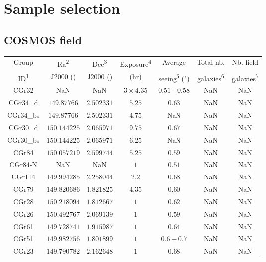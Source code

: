 \clearpage
\section{Sample selection}
\label{sec:Sample_selection}

\subsection{COSMOS field}

\begin{table}[htbp]

	\hspace{50pt}

	\begin{tabular}{ccccccc}
	\hline
	Group & Ra\textsuperscript{2} & Dec\textsuperscript{3} & Exposure\textsuperscript{4}  & Average & Total nb. & Nb. field \\
	
	ID\textsuperscript{1} & J2000 (\degree) & J2000 (\degree) & (hr) & seeing\textsuperscript{5} (") & galaxies\textsuperscript{6} & galaxies\textsuperscript{7} \\	
	
	\hline
	\hline
	CGr32 & NaN & NaN & $3 \times 4.35$ & $0.51$ - $0.58$ & NaN & NaN \\
	\hline
	CGr34\_d & $149.87766$ & $2.502331$ & $5.25$ & $0.63$ & NaN & NaN \\
	\hline
	CGr34\_bs & $149.87766$ & $2.502331$ & $4.75$ & NaN & NaN & NaN \\
	\hline
	CGr30\_d & $150.144225$ & $2.065971$ & $9.75$ & $0.67$ & NaN & NaN \\
	\hline
	CGr30\_bs & $150.144225$ & $2.065971$ & $6.25$ & NaN & NaN & NaN \\
	\hline
	CGr84 & $150.057219$ & $2.599744$ & $5.25$ & $0.59$ & NaN & NaN \\
	\hline
	CGr84-N & NaN & NaN & $1$ & $0.51$ & NaN & NaN \\
	\hline
	CGr114 & $149.994285$ & $2.258044$ & $2.2$ & $0.68$ & NaN & NaN \\
	\hline
	CGr79 & $149.820686$ & $1.821825$ & $4.35$ & $0.60$ & NaN & NaN \\
	\hline
	CGr28 & $150.218094$ & $1.812667$ & $1$ & $0.62$ & NaN & NaN \\
	\hline
	CGr26 & $150.492767$ & $2.069139$ & $1$ & $0.59$ & NaN & NaN \\
	\hline
	CGr61 & $149.728741$ & $1.915987$ & $1$ & $0.64$ & NaN & NaN \\
	\hline
	CGr51 & $149.982756$ & $1.801899$ & $1$ & $0.6-0.7$ & NaN & NaN \\
	\hline
	CGr23 & $149.790782$ & $2.162648$ & $1$ & $0.68$ & NaN & NaN \\
	\hline
	

\end{tabular}
\end{table}

